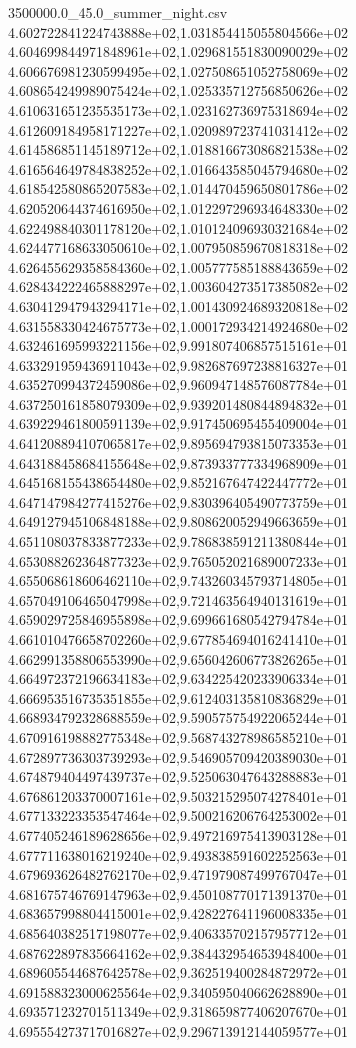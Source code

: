 \begin{filecontents*}{3500000.0_45.0_summer_night.csv}
4.602722841224743888e+02,1.031854415055804566e+02
4.604699844971848961e+02,1.029681551830090029e+02
4.606676981230599495e+02,1.027508651052758069e+02
4.608654249989075424e+02,1.025335712756850626e+02
4.610631651235535173e+02,1.023162736975318694e+02
4.612609184958171227e+02,1.020989723741031412e+02
4.614586851145189712e+02,1.018816673086821538e+02
4.616564649784838252e+02,1.016643585045794680e+02
4.618542580865207583e+02,1.014470459650801786e+02
4.620520644374616950e+02,1.012297296934648330e+02
4.622498840301178120e+02,1.010124096930321684e+02
4.624477168633050610e+02,1.007950859670818318e+02
4.626455629358584360e+02,1.005777585188843659e+02
4.628434222465888297e+02,1.003604273517385082e+02
4.630412947943294171e+02,1.001430924689320818e+02
4.631558330424675773e+02,1.000172934214924680e+02
4.632461695993221156e+02,9.991807406857515161e+01
4.633291959436911043e+02,9.982687697238816327e+01
4.635270994372459086e+02,9.960947148576087784e+01
4.637250161858079309e+02,9.939201480844894832e+01
4.639229461800591139e+02,9.917450695455409004e+01
4.641208894107065817e+02,9.895694793815073353e+01
4.643188458684155648e+02,9.873933777334968909e+01
4.645168155438654480e+02,9.852167647422447772e+01
4.647147984277415276e+02,9.830396405490773759e+01
4.649127945106848188e+02,9.808620052949663659e+01
4.651108037833877233e+02,9.786838591211380844e+01
4.653088262364877323e+02,9.765052021689007233e+01
4.655068618606462110e+02,9.743260345793714805e+01
4.657049106465047998e+02,9.721463564940131619e+01
4.659029725846955898e+02,9.699661680542794784e+01
4.661010476658702260e+02,9.677854694016241410e+01
4.662991358806553990e+02,9.656042606773826265e+01
4.664972372196634183e+02,9.634225420233906334e+01
4.666953516735351855e+02,9.612403135810836829e+01
4.668934792328688559e+02,9.590575754922065244e+01
4.670916198882775348e+02,9.568743278986585210e+01
4.672897736303739293e+02,9.546905709420389030e+01
4.674879404497439737e+02,9.525063047643288883e+01
4.676861203370007161e+02,9.503215295074278401e+01
4.677133223353547464e+02,9.500216206764253002e+01
4.677405246189628656e+02,9.497216975413903128e+01
4.677711638016219240e+02,9.493838591602252563e+01
4.679693626482762170e+02,9.471979087499767047e+01
4.681675746769147963e+02,9.450108770171391370e+01
4.683657998804415001e+02,9.428227641196008335e+01
4.685640382517198077e+02,9.406335702157957712e+01
4.687622897835664162e+02,9.384432954653948400e+01
4.689605544687642578e+02,9.362519400284872972e+01
4.691588323000625564e+02,9.340595040662628890e+01
4.693571232701511349e+02,9.318659877406207670e+01
4.695554273717016827e+02,9.296713912144059577e+01

\end{filecontents*}
